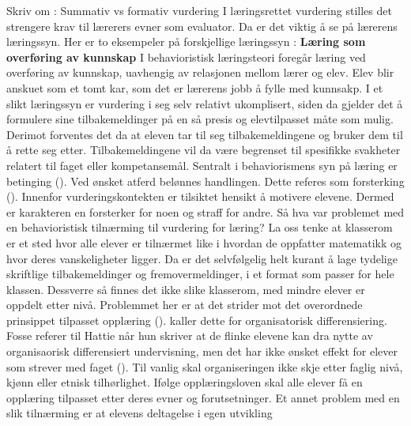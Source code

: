 \documentclass[main.tex]{subfiles}
\begin{document}
Skriv om : Summativ vs formativ vurdering
\newline
\newline
I læringsrettet vurdering stilles det strengere krav til lærerers evner som evaluator. Da er det viktig å se på lærerens læringssyn. 
Her er to eksempeler på forskjellige læringssyn :
\newline
\newline
\textbf{Læring som overføring av kunnskap}
\newline
I behavioristisk læringsteori foregår læring ved overføring av kunnskap, uavhengig av relasjonen mellom lærer 
og elev. Elev blir anskuet som et tomt kar, som det er lærerens jobb å fylle med kunnsakp. 
I et slikt læringssyn er vurdering i seg selv relativt ukomplisert, siden da gjelder det å 
formulere sine tilbakemeldinger på en så presis og elevtilpasset måte som mulig.
Derimot forventes det da at eleven tar til seg tilbakemeldingene og bruker dem til å rette seg etter.
Tilbakemeldingene vil da være begrenset til spesifikke svakheter relatert til faget eller kompetansemål.
Sentralt i behaviorismens syn på læring er betinging (). Ved ønsket atferd belønnes 
handlingen. Dette referes som forsterking (). Innenfor vurderingskontekten er
tilsiktet hensikt å motivere elevene. Dermed er karakteren en forsterker for noen og straff for andre.
\newline
\newline
Så hva var problemet med en behavioristisk tilnærming til vurdering for læring? La oss tenke at klasserom er 
et sted hvor alle elever er tilnærmet like i hvordan de oppfatter matematikk og hvor deres vanskeligheter ligger. 
Da er det selvfølgelig helt kurant å lage tydelige skriftlige tilbakemeldinger og fremovermeldinger, i et format 
som passer for hele klassen. Dessverre så finnes det ikke slike klasserom, med mindre elever er oppdelt etter nivå. 
Problemmet her er at det strider mot det overordnede prinsippet tilpasset opplæring (). 
 kaller dette for organisatorisk differensiering. Fosse referer til Hattie når hun skriver at de flinke 
elevene kan dra nytte av organisaorisk differensiert undervisning, men det har ikke ønsket effekt for elever som strever 
med faget (). Til vanlig skal organiseringen ikke skje etter
faglig nivå, kjønn eller etnisk tilhørlighet. Ifølge opplæringsloven skal alle elever få en opplæring tilpasset 
etter deres evner og forutsetninger. Et annet problem med en slik tilnærming er at elevens deltagelse i egen utvikling 
\end{document}
